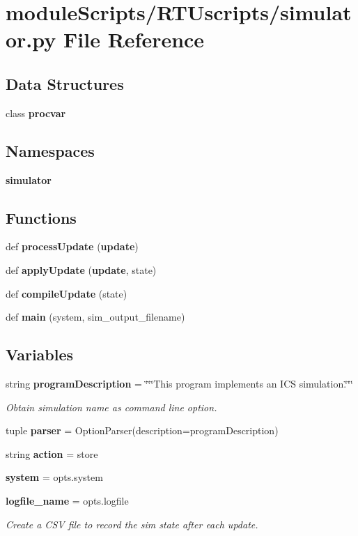 \section{module\+Scripts/\+R\+T\+Uscripts/simulator.py File Reference}
\label{simulator_8py}
\subsection*{Data Structures}
\begin{DoxyCompactItemize}
\item 
class {\bf procvar}
\end{DoxyCompactItemize}
\subsection*{Namespaces}
\begin{DoxyCompactItemize}
\item 
 {\bf simulator}
\end{DoxyCompactItemize}
\subsection*{Functions}
\begin{DoxyCompactItemize}
\item 
def {\bf process\+Update} ({\bf update})
\item 
def {\bf apply\+Update} ({\bf update}, state)
\item 
def {\bf compile\+Update} (state)
\item 
def {\bf main} (system, sim\+\_\+output\+\_\+filename)
\end{DoxyCompactItemize}
\subsection*{Variables}
\begin{DoxyCompactItemize}
\item 
string {\bf program\+Description} = \char`\"{}\char`\"{}\char`\"{}This program implements an I\+C\+S simulation.\char`\"{}\char`\"{}\char`\"{}
\begin{DoxyCompactList}\small\item\em Obtain simulation name as command line option. \end{DoxyCompactList}\item 
tuple {\bf parser} = Option\+Parser(description=program\+Description)
\item 
string {\bf action} = \textquotesingle{}store\textquotesingle{}
\item 
{\bf system} = opts.\+system
\item 
{\bf logfile\+\_\+name} = opts.\+logfile
\begin{DoxyCompactList}\small\item\em Create a C\+S\+V file to record the sim state after each update. \end{DoxyCompactList}\end{DoxyCompactItemize}
